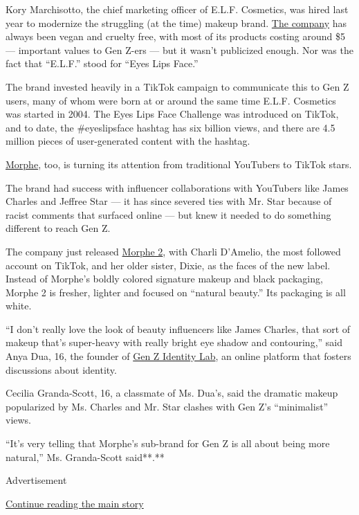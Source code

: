 Kory Marchisotto, the chief marketing officer of E.L.F. Cosmetics, was
hired last year to modernize the struggling (at the time) makeup brand.
\href{https://www.elfcosmetics.com/}{The company} has always been vegan
and cruelty free, with most of its products costing around \$5 ---
important values to Gen Z-ers --- but it wasn't publicized enough. Nor
was the fact that ``E.L.F.'' stood for ``Eyes Lips Face.''

The brand invested heavily in a TikTok campaign to communicate this to
Gen Z users, many of whom were born at or around the same time E.L.F.
Cosmetics was started in 2004. The Eyes Lips Face Challenge was
introduced on TikTok, and to date, the \#eyeslipsface hashtag has six
billion views, and there are 4.5 million pieces of user-generated
content with the hashtag.

\href{https://www.morphe.com/}{Morphe}, too, is turning its attention
from traditional YouTubers to TikTok stars.

The brand had success with influencer collaborations with YouTubers like
James Charles and Jeffree Star --- it has since severed ties with Mr.
Star because of racist comments that surfaced online --- but knew it
needed to do something different to reach Gen Z.

The company just released
\href{https://www.morphe.com/pages/morphe-2-signup}{Morphe 2}, with
Charli D'Amelio, the most followed account on TikTok, and her older
sister, Dixie, as the faces of the new label. Instead of Morphe's boldly
colored signature makeup and black packaging, Morphe 2 is fresher,
lighter and focused on ``natural beauty.'' Its packaging is all white.

``I don't really love the look of beauty influencers like James Charles,
that sort of makeup that's super-heavy with really bright eye shadow and
contouring,'' said Anya Dua, 16, the founder of
\href{https://genzidentitylab.com/}{Gen Z Identity Lab}, an online
platform that fosters discussions about identity.

Cecilia Granda-Scott, 16, a classmate of Ms. Dua's, said the dramatic
makeup popularized by Ms. Charles and Mr. Star clashes with Gen Z's
``minimalist'' views.

``It's very telling that Morphe's sub-brand for Gen Z is all about being
more natural,'' Ms. Granda-Scott said**.**

Advertisement

\protect\hyperlink{after-bottom}{Continue reading the main story}

